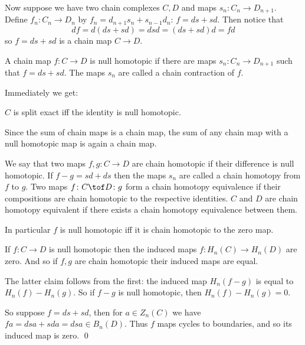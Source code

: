 \eexam

Now suppose we have two chain complexes $C,D$ and maps $s_n\colon C_n\to D_{n+1}$.
Define $f_n\colon C_n\to D_n$ by $f_n=d_{n+1}s_n+s_{n-1}d_n$: $f=ds+sd$.
Then notice that
$$ df = d(ds+sd) = dsd = (ds+sd)d = fd $$
so $f=ds+sd$ is a chain map $C\to D$.

\bdefn

    A chain map $f\colon C\to D$ is {\emphcolor null homotopic} if there are maps $s_n\colon C_n\to D_{n+1}$ such that $f=ds+sd$.
    The maps $s_n$ are called a {\emphcolor chain contraction} of $f$.

\edefn

Immediately we get:

\bprop

    $C$ is split exact iff the identity is null homotopic.

\eprop

Since the sum of chain maps is a chain map, the sum of any chain map with a null homotopic map is again a chain map.

\bdefn

    We say that two maps $f,g\colon C\to D$ are {\emphcolor chain homotopic} if their difference is null homotopic.
    If $f-g=sd+ds$ then the maps $s_n$ are called a {\emphcolor chain homotopy} from $f$ to $g$.
    Two maps $f\colon C\tof D\colon g$ form a {\emphcolor chain homotopy equivalence} if their compositions are chain homotopic to the respective identities.
    $C$ and $D$ are {\emphcolor chain homotopy equivalent} if there exists a chain homotopy equivalence between them.

\edefn

In particular $f$ is null homotopic iff it is chain homotopic to the zero map.

\blemm

    If $f\colon C\to D$ is null homotopic then the induced maps $f\colon H_n(C)\to H_n(D)$ are zero.
    And so if $f,g$ are chain homotopic their induced maps are equal.

\elemm

\bproof

    The latter claim follows from the first: the induced map $H_n(f-g)$ is equal to $H_n(f)-H_n(g)$.
    So if $f-g$ is null homotopic, then $H_n(f)-H_n(g)=0$.

    So suppose $f=ds+sd$, then for $a\in Z_n(C)$ we have $fa=dsa+sda=dsa\in B_n(D)$.
    Thus $f$ maps cycles to boundaries, and so its induced map is zero.
    \qed

